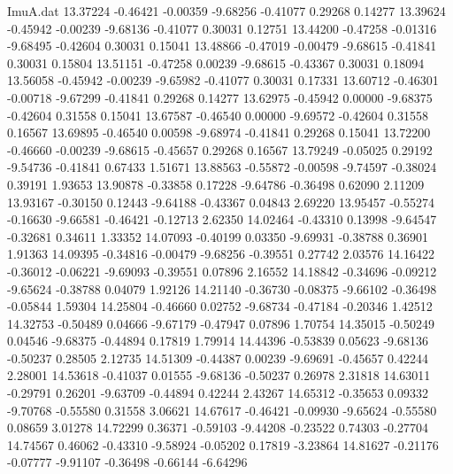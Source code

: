 \begin{filecontents}{ImuA.dat}
  13.37224   -0.46421   -0.00359   -9.68256   -0.41077    0.29268    0.14277
  13.39624   -0.45942   -0.00239   -9.68136   -0.41077    0.30031    0.12751
  13.44200   -0.47258   -0.01316   -9.68495   -0.42604    0.30031    0.15041
  13.48866   -0.47019   -0.00479   -9.68615   -0.41841    0.30031    0.15804
  13.51151   -0.47258    0.00239   -9.68615   -0.43367    0.30031    0.18094
  13.56058   -0.45942   -0.00239   -9.65982   -0.41077    0.30031    0.17331
  13.60712   -0.46301   -0.00718   -9.67299   -0.41841    0.29268    0.14277
  13.62975   -0.45942    0.00000   -9.68375   -0.42604    0.31558    0.15041
  13.67587   -0.46540    0.00000   -9.69572   -0.42604    0.31558    0.16567
  13.69895   -0.46540    0.00598   -9.68974   -0.41841    0.29268    0.15041
  13.72200   -0.46660   -0.00239   -9.68615   -0.45657    0.29268    0.16567
  13.79249   -0.05025    0.29192   -9.54736   -0.41841    0.67433    1.51671
  13.88563   -0.55872   -0.00598   -9.74597   -0.38024    0.39191    1.93653
  13.90878   -0.33858    0.17228   -9.64786   -0.36498    0.62090    2.11209
  13.93167   -0.30150    0.12443   -9.64188   -0.43367    0.04843    2.69220
  13.95457   -0.55274   -0.16630   -9.66581   -0.46421   -0.12713    2.62350
  14.02464   -0.43310    0.13998   -9.64547   -0.32681    0.34611    1.33352
  14.07093   -0.40199    0.03350   -9.69931   -0.38788    0.36901    1.91363
  14.09395   -0.34816   -0.00479   -9.68256   -0.39551    0.27742    2.03576
  14.16422   -0.36012   -0.06221   -9.69093   -0.39551    0.07896    2.16552
  14.18842   -0.34696   -0.09212   -9.65624   -0.38788    0.04079    1.92126
  14.21140   -0.36730   -0.08375   -9.66102   -0.36498   -0.05844    1.59304
  14.25804   -0.46660    0.02752   -9.68734   -0.47184   -0.20346    1.42512
  14.32753   -0.50489    0.04666   -9.67179   -0.47947    0.07896    1.70754
  14.35015   -0.50249    0.04546   -9.68375   -0.44894    0.17819    1.79914
  14.44396   -0.53839    0.05623   -9.68136   -0.50237    0.28505    2.12735
  14.51309   -0.44387    0.00239   -9.69691   -0.45657    0.42244    2.28001
  14.53618   -0.41037    0.01555   -9.68136   -0.50237    0.26978    2.31818
  14.63011   -0.29791    0.26201   -9.63709   -0.44894    0.42244    2.43267
  14.65312   -0.35653    0.09332   -9.70768   -0.55580    0.31558    3.06621
  14.67617   -0.46421   -0.09930   -9.65624   -0.55580    0.08659    3.01278
  14.72299    0.36371   -0.59103   -9.44208   -0.23522    0.74303   -0.27704
  14.74567    0.46062   -0.43310   -9.58924   -0.05202    0.17819   -3.23864
  14.81627   -0.21176   -0.07777   -9.91107   -0.36498   -0.66144   -6.64296

\end{filecontents}
